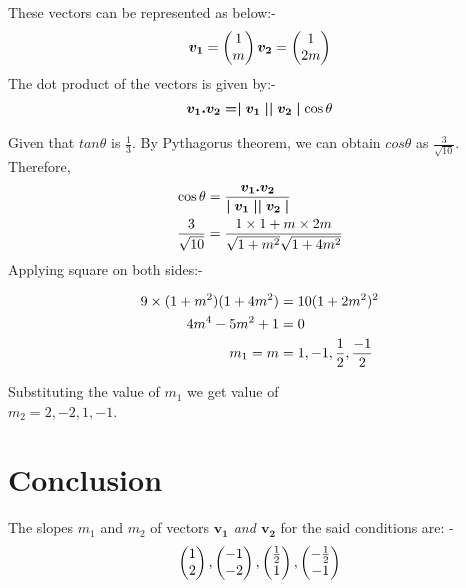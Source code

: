 \documentclass[conference]{IEEEtran}
\newcommand{\myvec}[1]{\ensuremath{\begin{pmatrix}#1\end{pmatrix}}}
\begin{document}
These vectors can be represented as below:-
\begin{align}\notag
\bm{v_{1}} =\myvec{ 1 \\m }
\bm{v_{2}} =\myvec{1\\2m}
 \end{align}
The dot product of the vectors is given by:-
\begin{align}\notag
 \bm{v_{1}  .  v_{2} = \mid v_{1}\mid \mid v_{2}\mid } \cos \theta
\end{align}

Given that $tan \theta$ is $\frac{1}{3}$. By Pythagorus theorem, we can obtain $cos \theta$ as $\frac{3}{\sqrt{10}}$.
Therefore,
\begin{align}\notag
\cos \theta &= \frac{\bm{v_{1}  .  v_{2}}}{\bm{\mid v_{1}\mid \mid v_{2}\mid}}\\\notag
\frac{3}{\sqrt{10}} &=  \frac{1 \times 1 + {m \times 2m}}{{\sqrt{1 + m^2}\sqrt{1 +4 m^2}}}
\end{align}
Applying square on both sides:-

\begin{align}\notag
9 \times (1 + m^2) (1 + 4 m^2) & = 10 ( 1 + 2 m^2)^2\\ \notag
4 m^4 - 5 m^2 + 1 &=0\\ \notag
m_{1} = m &= 1, -1,\frac{1}{2},\frac{-1}{2}
\end{align}

Substituting the value of $ m_{1}$ we get value of\\
$ m_{2} = 2, -2, 1, -1$.\\

\section{Conclusion}
The slopes $ m_{1}$ and $ m_{2} $ of vectors \textit{$\bm{v_{1}}$  and    $\bm{v_{2}}$} for the said conditions are: -
 \begin{align}\notag
\myvec{1 \\ 2} , \myvec{-1 \\ -2} ,\myvec{ \frac{1}{2}\\1} ,\myvec{- \frac{1}{2}\\ -1}
\end{align}
\end{document}
